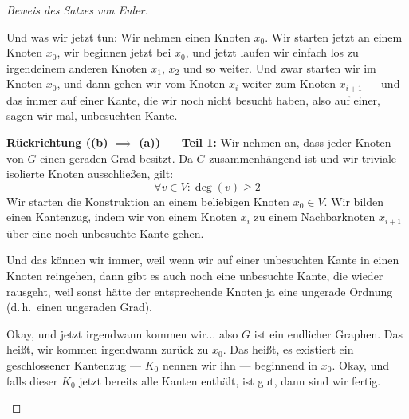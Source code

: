 \begin{proof}[Beweis des Satzes von Euler]
\begin{spoken-clean}[00:11:15 - 00:13:38]

Und was wir jetzt tun: Wir nehmen einen Knoten $x_0$. Wir starten jetzt an einem Knoten $x_0$, wir beginnen jetzt bei $x_0$, und jetzt laufen wir einfach los zu irgendeinem anderen Knoten $x_1$, $x_2$ und so weiter. Und zwar starten wir im Knoten $x_0$, und dann gehen wir vom Knoten $x_i$ weiter zum Knoten $x_{i+1}$ --- und das immer auf einer Kante, die wir noch nicht besucht haben, also auf einer, sagen wir mal, unbesuchten Kante. 
\end{spoken-clean}


\begin{ai-global-state-checkpoint-invisible-content}
\end{ai-global-state-checkpoint-invisible-content}

\begin{math-stroke}
\textbf{Rückrichtung (\texorpdfstring{\textbf{(b)} $\implies$ \textbf{(a)}}{b -> a}) --- Teil 1:}
Wir nehmen an, dass jeder Knoten von $G$ einen geraden Grad besitzt. Da $G$ zusammenhängend ist und wir triviale isolierte Knoten ausschließen, gilt:
\[
\forall v \in V \colon \deg(v) \ge 2
\]
Wir starten die Konstruktion an einem beliebigen Knoten $x_0 \in V$. Wir bilden einen Kantenzug, indem wir von einem Knoten $x_i$ zu einem Nachbarknoten $x_{i+1}$ über eine noch unbesuchte Kante gehen.
\end{math-stroke}

\begin{spoken-clean}[00:13:38 - 00:15:10]
Und das können wir immer, weil wenn wir auf einer unbesuchten Kante in einen Knoten reingehen, dann gibt es auch noch eine unbesuchte Kante, die wieder rausgeht, weil sonst hätte der entsprechende Knoten ja eine ungerade Ordnung (d.\,h.\ einen ungeraden Grad).

Okay, und jetzt irgendwann kommen wir... also $G$ ist ein endlicher Graphen. Das heißt, wir kommen irgendwann zurück zu $x_0$.  Das heißt, es existiert ein geschlossener Kantenzug --- $K_0$ nennen wir ihn --- beginnend in $x_0$. Okay, und falls dieser $K_0$ jetzt bereits alle Kanten enthält, ist gut, dann sind wir fertig.


\end{spoken-clean}
\end{proof}
